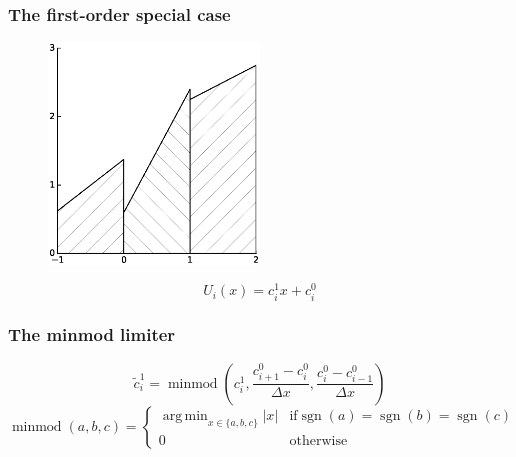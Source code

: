 \documentclass[11pt]{beamer}
\DeclareMathOperator{\minmod}{minmod}
\DeclareMathOperator{\sgn}{sgn}
\DeclareMathOperator*{\argmin}{arg\,min}
\begin{document}
\begin{frame}
  \frametitle{The first-order special case}
  \begin{figure}[h]
    \centering
    \includegraphics[width=0.5\textwidth]{figures/minmod/setup}
  \end{figure}
  \begin{equation*}
    U_{i}(x) = c_{i}^{1}x + c_{i}^{0}
  \end{equation*}
\end{frame}

\begin{frame}
  \frametitle{The minmod limiter}
  \begin{equation*}
    \tilde{c}_{i}^{1} = \minmod\left( c_{i}^{1}, \frac{c_{i + 1}^{0} - c_{i}^{0}}{\Delta x}, \frac{c_{i}^{0} - c_{i - 1}^{0}}{\Delta x} \right)
  \end{equation*}
  \vspace{1.5em}
  \begin{equation*}
    \minmod(a, b, c) = \begin{cases}
      \displaystyle\argmin_{x \in \{ a, b, c \}} |x| & \text{if} \sgn(a) = \sgn(b) = \sgn(c)\\
      0 & \text{otherwise}
    \end{cases}
  \end{equation*}
\end{frame}
\end{document}
